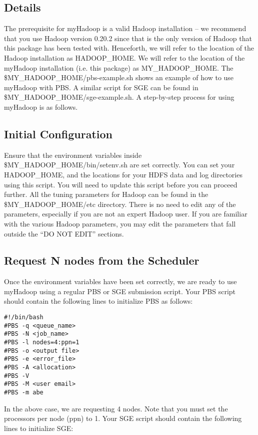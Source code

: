 \subsection{Details}

The prerequisite for myHadoop is a valid Hadoop installation – we recommend that you
use Hadoop version 0.20.2 since that is the only version of Hadoop that this package has
been tested with. Henceforth, we will refer to the location of the Hadoop installation as
HADOOP\_HOME. We will refer to the location of the myHadoop installation (i.e. this
package) as MY\_HADOOP\_HOME. The \$MY\_HADOOP\_HOME/pbs-example.sh shows
an example of how to use myHadoop with PBS. A similar script for SGE can be found in
\$MY\_HADOOP\_HOME/sge-example.sh.
A step-by-step process for using myHadoop is as follows.

\subsection{Initial Configuration}

Ensure that the environment variables inside \$MY\_HADOOP\_HOME/bin/setenv.sh are
set correctly. You can set your HADOOP\_HOME, and the locations for your HDFS data
and log directories using this script. You will need to update this script before you can
proceed further.
All the tuning parameters for Hadoop can be found in the \$MY\_HADOOP\_HOME/etc
directory. There is no need to edit any of the parameters, especially if you are not an
expert Hadoop user. If you are familiar with the various Hadoop parameters, you may
edit the parameters that fall outside the “DO NOT EDIT” sections.

\subsection{Request N nodes from the Scheduler}

Once the environment variables have been set correctly, we are ready to use myHadoop
using a regular PBS or SGE submission script. Your PBS script should contain the
following lines to initialize PBS as follows:

\begin{verbatim}
#!/bin/bash
#PBS -q <queue_name>
#PBS -N <job_name>
#PBS -l nodes=4:ppn=1
#PBS -o <output file>
#PBS -e <error_file>
#PBS -A <allocation>
#PBS -V
#PBS -M <user email>
#PBS -m abe
\end{verbatim}

In the above case, we are requesting 4 nodes. Note that you must set the processors per
node (ppn) to 1.
Your SGE script should contain the following lines to initialize SGE:

